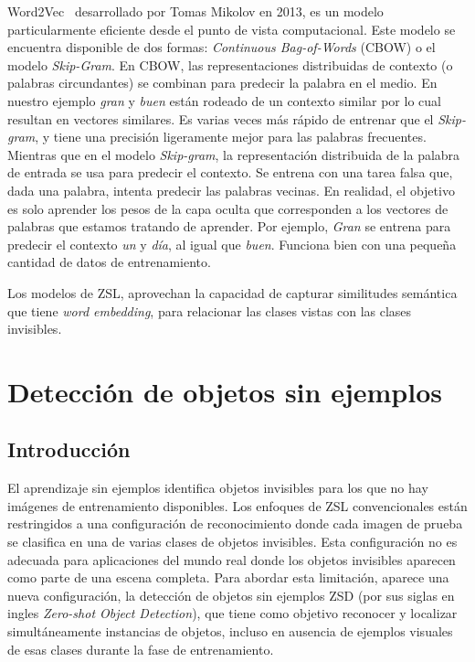 Word2Vec~\cite{mikolov2013distributed} desarrollado por Tomas Mikolov en 2013, es un modelo particularmente eficiente desde el punto de vista computacional. Este modelo se encuentra disponible de dos formas: \textit{Continuous Bag-of-Words} (CBOW) o el modelo \textit{Skip-Gram}. En CBOW, las representaciones distribuidas de contexto (o palabras circundantes) se combinan para predecir la palabra en el medio. En nuestro ejemplo \textit{gran} y \textit{buen} están rodeado de un contexto similar por lo cual resultan en vectores similares. Es varias veces más rápido de entrenar que el \textit{Skip-gram}, y tiene una precisión ligeramente mejor para las palabras frecuentes. Mientras que en el modelo \textit{Skip-gram}, la representación distribuida de la palabra de entrada se usa para predecir el contexto. Se entrena con una tarea falsa que, dada una palabra, intenta predecir las palabras vecinas. En realidad, el objetivo es solo aprender los pesos de la capa oculta que corresponden a los vectores de palabras que estamos tratando de aprender. Por ejemplo, \textit{Gran} se entrena para predecir el contexto \textit{un} y  \textit{día}, al igual que \textit{buen}. Funciona bien con una pequeña cantidad de datos de entrenamiento.

Los modelos de ZSL, aprovechan la capacidad de capturar similitudes semántica que tiene \textit{word embedding}, para relacionar las clases vistas con las clases invisibles.\\



\section{Detección de objetos sin ejemplos} \label{sec:detecciondeobjetossinejemplo}

\subsection{Introducción} 
El aprendizaje sin ejemplos identifica objetos invisibles para los que no hay imágenes de entrenamiento disponibles. Los enfoques de ZSL convencionales están restringidos a una configuración de reconocimiento donde cada imagen de prueba se clasifica en una de varias clases de objetos invisibles. Esta configuración no es adecuada para aplicaciones del mundo real donde los objetos invisibles aparecen como parte de una escena completa. Para abordar esta limitación, aparece una nueva configuración, la detección de objetos sin ejemplos ZSD (por sus siglas en ingles \textit{Zero-shot Object Detection}), que tiene como objetivo reconocer y localizar simultáneamente instancias de objetos, incluso en ausencia de ejemplos visuales de esas clases durante la fase de entrenamiento.\\

